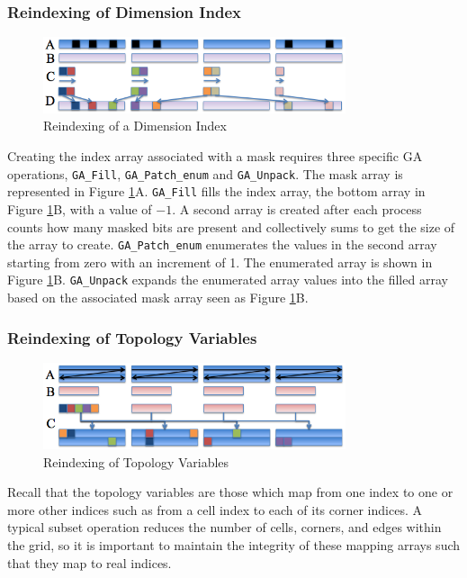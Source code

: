 \subsubsection{Reindexing of Dimension Index}

\begin{figure}[!t]
\center
\includegraphics[width=3.5in]{images/unpack}
\caption{Reindexing of a Dimension Index}
\label{fig:unpack}
\end{figure}

Creating the index array associated with a mask requires three specific GA
operations, \verb=GA_Fill=, \verb=GA_Patch_enum= and \verb=GA_Unpack=.  The
mask array is represented in Figure \ref{fig:unpack}A.  \verb=GA_Fill= fills
the index array, the bottom array in Figure \ref{fig:unpack}B,  with a value
of $-1$.  A second array is created after each process counts how many masked
bits are present and collectively sums to get the size of the array to create.
\verb=GA_Patch_enum= enumerates the values in the second array starting from
zero with an increment of 1.  The enumerated array is shown in Figure
\ref{fig:unpack}B.  \verb=GA_Unpack= expands the enumerated array values into
the filled array based on the associated mask array seen as Figure
\ref{fig:unpack}B.

\subsubsection{Reindexing of Topology Variables}

\begin{figure}[!t]
\center
\includegraphics[width=3.5in]{images/reindex}
\caption{Reindexing of Topology Variables}
\label{fig:reindex}
\end{figure}

Recall that the topology variables are those which map from one index to
one or more other indices such as from a cell index to each of its corner
indices.  A typical subset operation reduces the number of cells, corners, and
edges within the grid, so it is important to maintain the integrity of these
mapping arrays such that they map to real indices.

